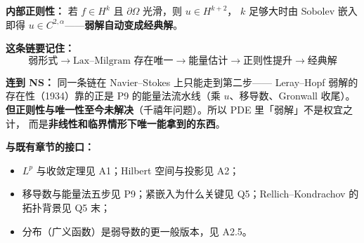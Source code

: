 \textbf{内部正则性：} 若 $f\in H^k$ 且 $\partial\Omega$ 光滑，则 $u\in H^{k+2}$，
$k$ 足够大时由 Sobolev 嵌入即得 $u\in C^{2,\alpha}$——\textbf{弱解自动变成经典解}。

\textbf{这条链要记住：}
\[
\text{弱形式}\to\text{Lax--Milgram 存在唯一}\to\text{能量估计}\to\text{正则性提升}\to\text{经典解}
\]

\textbf{连到 NS：} 同一条链在 Navier--Stokes 上只能走到第二步——
Leray--Hopf 弱解的存在性（1934）靠的正是 P9 的能量法流水线（乘 $u$、移导数、Gronwall 收尾）。
\textbf{但正则性与唯一性至今未解决}（千禧年问题）。所以 PDE 里「弱解」不是权宜之计，
而是\textbf{非线性和临界情形下唯一能拿到的东西}。

\textbf{与既有章节的接口：}
\begin{itemize}
  \item $L^p$ 与收敛定理见 A1；Hilbert 空间与投影见 A2；
  \item 移导数与能量法五步见 P9；紧嵌入为什么关键见 Q5；Rellich--Kondrachov 的拓扑背景见 Q5 末；
  \item 分布（广义函数）是弱导数的更一般版本，见 A2.5。
\end{itemize}